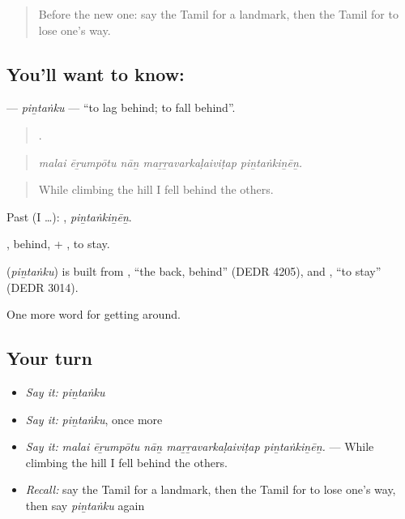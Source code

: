 \label{lesson:TA-C412-pintanku}



\begin{quote}
Before the new one: say the Tamil for a landmark, then the Tamil for to lose one's way.
\end{quote}

\subsection*{You'll want to know: }
\textbf{} — \emph{piṉtaṅku} — \textquotedblleft{}to lag behind; to fall behind\textquotedblright{}.

\begin{quote}
    .
\end{quote}

\begin{quote}
\emph{malai ēṟumpōtu nāṉ maṟṟavarkaḷaiviṭap piṉtaṅkiṉēṉ.}
\end{quote}

\begin{quote}
While climbing the hill I fell behind the others.
\end{quote}

Past (I …): , \emph{piṉtaṅkiṉēṉ}.

, behind, + , to stay.

\begin{cousinweb}
\textbf{} (\emph{piṉtaṅku}) is built from , \textquotedblleft{}the back, behind\textquotedblright{} (DEDR 4205), and , \textquotedblleft{}to stay\textquotedblright{} (DEDR 3014).
\end{cousinweb}

\begin{grammarlens}[title={What you've built}]
One more word for getting around.
\end{grammarlens}

\subsection*{Your turn}
\begin{itemize}
\raggedright
  \item \emph{Say it:} \emph{piṉtaṅku}
  \item \emph{Say it:} \emph{piṉtaṅku}, once more
  \item \emph{Say it:} \emph{malai ēṟumpōtu nāṉ maṟṟavarkaḷaiviṭap piṉtaṅkiṉēṉ.} — While climbing the hill I fell behind the others.
  \item \emph{Recall:} say the Tamil for a landmark, then the Tamil for to lose one's way, then say \emph{piṉtaṅku} again
\end{itemize}

